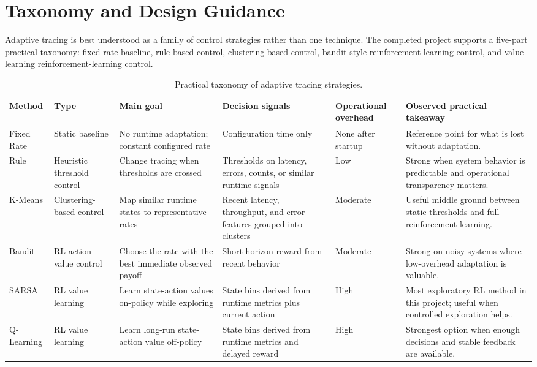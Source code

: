 \documentclass[10pt,twocolumn]{article}
\begin{document}
\section{Taxonomy and Design Guidance}
Adaptive tracing is best understood as a family of control strategies rather than one technique. The completed project supports a five-part practical taxonomy: fixed-rate baseline, rule-based control, clustering-based control, bandit-style reinforcement-learning control, and value-learning reinforcement-learning control.

\begin{table}[t]
\centering
\small
\caption{Practical taxonomy of adaptive tracing strategies.}
\begin{tabularx}{\textwidth}{p{1.7cm}p{2.0cm}p{2.2cm}p{2.8cm}p{1.3cm}X}
\toprule
Method & Type & Main goal & Decision signals & Operational overhead & Observed practical takeaway \\
\midrule
Fixed Rate & Static baseline & No runtime adaptation; constant configured rate & Configuration time only & None after startup & Reference point for what is lost without adaptation. \\
Rule & Heuristic threshold control & Change tracing when thresholds are crossed & Thresholds on latency, errors, counts, or similar runtime signals & Low & Strong when system behavior is predictable and operational transparency matters. \\
K-Means & Clustering-based control & Map similar runtime states to representative rates & Recent latency, throughput, and error features grouped into clusters & Moderate & Useful middle ground between static thresholds and full reinforcement learning. \\
Bandit & RL action-value control & Choose the rate with the best immediate observed payoff & Short-horizon reward from recent behavior & Moderate & Strong on noisy systems where low-overhead adaptation is valuable. \\
SARSA & RL value learning & Learn state-action values on-policy while exploring & State bins derived from runtime metrics plus current action & High & Most exploratory RL method in this project; useful when controlled exploration helps. \\
Q-Learning & RL value learning & Learn long-run state-action value off-policy & State bins derived from runtime metrics and delayed reward & High & Strongest option when enough decisions and stable feedback are available. \\
\bottomrule
\end{tabularx}
\end{table}
\end{document}
